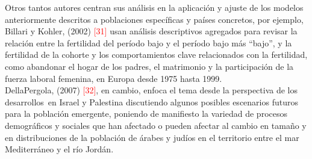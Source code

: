 Otros tantos autores centran sus análisis en la aplicación y ajuste de los modelos anteriormente descritos a poblaciones específicas y países concretos, por ejemplo, Billari y Kohler, (2002) \textcolor{red}{[31]} usan análisis descriptivos agregados para revisar la relación entre la fertilidad del período bajo y el período bajo más ``bajo'', y la fertilidad de la cohorte y los comportamientos clave relacionados con la fertilidad, como abandonar el hogar de los padres, el matrimonio y la participación de la fuerza laboral femenina, en Europa desde 1975 hasta 1999.\\

DellaPergola, (2007) \textcolor{red}{[32]}, en cambio, enfoca el tema desde la perspectiva de los desarrollos\ en Israel y Palestina discutiendo algunos posibles escenarios futuros para la población emergente, poniendo de manifiesto la variedad de procesos demográficos y sociales que han afectado o pueden afectar al cambio en tamaño y en distribuciones de la población de árabes y judíos en el territorio entre el mar Mediterráneo y el río Jordán.\\

